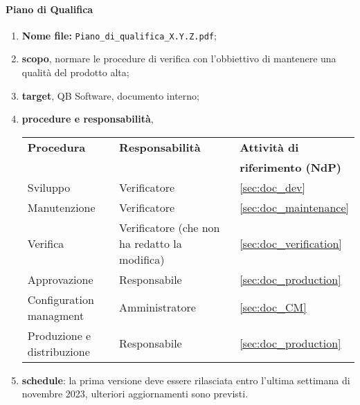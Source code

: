         \paragraph{Piano di Qualifica}
            \begin{enumerate}
                \item \textbf{Nome file:} \texttt{Piano\_di\_qualifica\_X.Y.Z.pdf};
                \item \textbf{scopo}, normare le procedure di verifica con l'obbiettivo di mantenere una qualità del prodotto alta;
                \item \textbf{target}, QB Software, documento interno;
                \item \textbf{procedure e responsabilità},
                \\
                \begin{tabularx}{0.93\textwidth}{|X|X|X|}
                    \hline
                    \textbf{Procedura} & \textbf{Responsabilità} & \textbf{Attività di} \\
                    & & \textbf{riferimento (NdP)} \\
                    \hline
                    Sviluppo & Verificatore &  \ref{sec:doc_dev}
                    \\\hline
                    Manutenzione & Verificatore & \ref{sec:doc_maintenance} 
                    \\\hline
                    Verifica & Verificatore (che non ha redatto la modifica) & \ref{sec:doc_verification}
                    \\\hline
                    Approvazione & Responsabile & \ref{sec:doc_production}
                    \\\hline
                    Configuration managment & Amministratore & \ref{sec:doc_CM}
                    \\\hline
                    Produzione e distribuzione & Responsabile & \ref{sec:doc_production}
                    \\\hline
                \end{tabularx}
                \item \textbf{schedule}: la prima versione deve essere rilasciata entro l'ultima settimana di novembre 2023, ulteriori aggiornamenti sono previsti.
            \end{enumerate} 

